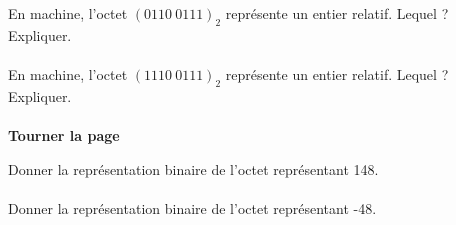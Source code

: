 \documentclass[a4paper,12pt,eval,firamath]{nsi}
\begin{document}
\maketitle

En machine, l'octet $(0110\ 0111)_2$ représente un entier relatif. Lequel ? Expliquer.\\

\\

En machine, l'octet $(1110\ 0111)_2$ représente un entier relatif. Lequel ? Expliquer.\\

\\

\hfill\textbf{Tourner la page}

\newpage

Donner la représentation binaire de l'octet représentant 148. \\

\\

Donner la représentation binaire de l'octet représentant -48. \\

\end{document}

